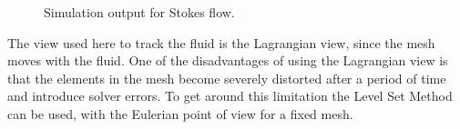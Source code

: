 \begin{figure}[ht]
\caption{Simulation output for Stokes flow.}
\label{FLUID OUTPUT2}
\end{figure}
%
The view used here to track the fluid is the Lagrangian view, since the mesh moves with the fluid. One of the disadvantages of using the Lagrangian view is that the elements in the mesh become severely distorted after a period of time and introduce solver errors. To get around this limitation the Level Set Method can be used, with the Eulerian point of view for a fixed mesh. 
